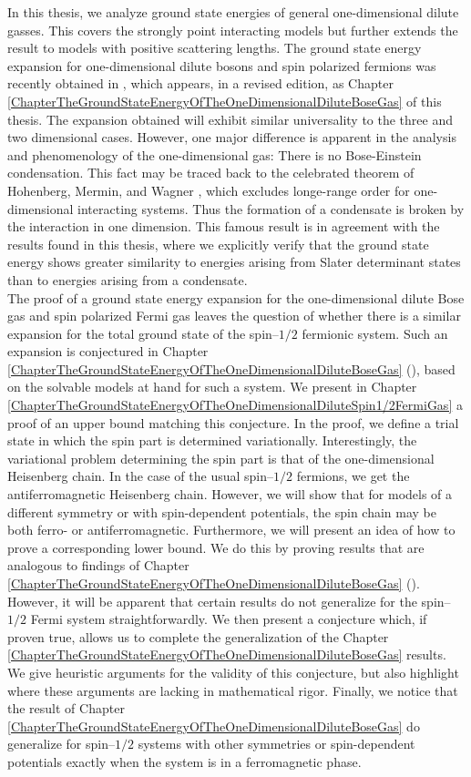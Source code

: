 In this thesis, we analyze ground state energies of general one-dimensional dilute gasses. This covers the strongly point interacting models but further extends the result to models with positive scattering lengths. The ground state energy expansion for one-dimensional dilute bosons and spin polarized fermions was recently obtained in \cite{agerskov2022ground}, which appears, in a revised edition, as Chapter \ref{ChapterTheGroundStateEnergyOfTheOneDimensionalDiluteBoseGas} of this thesis. The expansion obtained will exhibit similar universality to the three and two dimensional cases. However, one major difference is apparent in the analysis and phenomenology of the one-dimensional gas: There is no Bose-Einstein condensation. This fact may be traced back to the celebrated theorem of Hohenberg, Mermin, and Wagner \cite{hohenberg1967existence,mermin1966absence}, which excludes longe-range order for one-dimensional interacting systems. Thus the formation of a condensate is broken by the interaction in one dimension. This famous result is in agreement with the results found in this thesis, where we explicitly verify that the ground state energy shows greater similarity to energies arising from Slater determinant states than to energies arising from a condensate.\\
The proof of a ground state energy expansion for the one-dimensional dilute Bose gas and spin polarized Fermi gas leaves the question of whether there is a similar expansion for the total ground state of the spin--$ 1/2 $ fermionic system. Such an expansion is conjectured in Chapter \ref{ChapterTheGroundStateEnergyOfTheOneDimensionalDiluteBoseGas} (\cite{agerskov2022ground}), based on the solvable models at hand for such a system. We present in Chapter \ref{ChapterTheGroundStateEnergyOfTheOneDimensionalDiluteSpin1/2FermiGas} a proof of an upper bound matching this conjecture. In the proof, we define a trial state in which the spin part is determined variationally. Interestingly, the variational problem determining the spin part is that of the one-dimensional Heisenberg chain. In the case of the usual spin--$ 1/2 $ fermions, we get the antiferromagnetic Heisenberg chain. However, we will show that for models of a different symmetry or with spin-dependent potentials, the spin chain may be both ferro- or antiferromagnetic. Furthermore, we will present an idea of how to prove a corresponding lower bound. We do this by proving results that are analogous to findings of Chapter \ref{ChapterTheGroundStateEnergyOfTheOneDimensionalDiluteBoseGas} (\cite{agerskov2022ground}). However, it will be apparent that certain results do not generalize for the spin--$ 1/2 $ Fermi system straightforwardly. We then present a conjecture which, if proven true, allows us to complete the generalization of the Chapter \ref{ChapterTheGroundStateEnergyOfTheOneDimensionalDiluteBoseGas} results. We give heuristic arguments for the validity of this conjecture, but also highlight where these arguments are lacking in mathematical rigor. Finally, we notice that the result of Chapter \ref{ChapterTheGroundStateEnergyOfTheOneDimensionalDiluteBoseGas} do generalize for spin--$ 1/2 $ systems with other symmetries or spin-dependent potentials exactly when the system is in a ferromagnetic phase.\\

